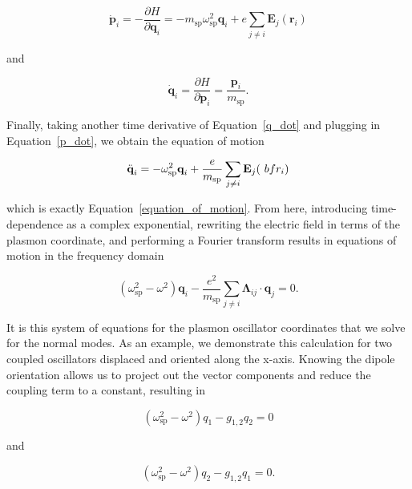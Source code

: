 \documentclass[journal=apchd5,manuscript=article]{achemso}
\begin{document}
\begin{equation}
\dot{\textbf{p}}_i = -\frac{\partial H}{\partial\textbf{q}_i} = -m_{\textrm{sp}}\omega_{\textrm{sp}}^2\textbf{q}_i + e\sum_{j\neq i}\textbf{E}_j(\textbf{r}_i)
\label{p_dot}
\end{equation}

\noindent and

\begin{equation}
\dot{\textbf{q}}_i = \frac{\partial H}{\partial\textbf{p}_i} = \frac{\textbf{p}_i}{m_{\textrm{sp}}}.
\label{q_dot}
\end{equation}

Finally, taking another time derivative of Equation~\ref{q_dot} and plugging in Equation~\ref{p_dot}, we obtain the equation of motion

\begin{equation}
\ddot{\textbf{q}}_i = -\omega_{\textrm{sp}}^2\textbf{q}_i + \frac{e}{m_{\textrm{sp}}}\sum_{j\neq i}\textbf{E}_j(\text\
bf{r}_i)
\label{equation_of_motion_again}
\end{equation}

\noindent which is exactly Equation~\ref{equation_of_motion}. From here, introducing time-dependence as a complex exponential, rewriting the electric field in terms of the plasmon coordinate, and performing a Fourier transform results in equations of motion in the frequency domain

\begin{equation}
(\omega_{\textrm{sp}}^2-\omega^2)\textbf{q}_i -\frac{e^2}{m_\textrm{sp}}\sum_{j\neq i}\boldsymbol{\Lambda}_{ij}\cdot\textbf{q}_j = 0.
\label{fourier_eom}
\end{equation}

It is this system of equations for the plasmon oscillator coordinates that we solve for the normal modes. As an example, we demonstrate this calculation for two coupled oscillators displaced and oriented along the x-axis. Knowing the dipole orientation allows us to project out the vector components and reduce the coupling term to a constant, resulting in

\begin{equation}
(\omega_{\textrm{sp}}^2-\omega^2)q_1 -g_{1,2}q_2 = 0
\label{fourier_eom_1}
\end{equation}

and

\begin{equation}
(\omega_{\textrm{sp}}^2-\omega^2)q_2 -g_{1,2}q_1 = 0.
\label{fourier_eom_2}
\end{equation}
\end{document}
